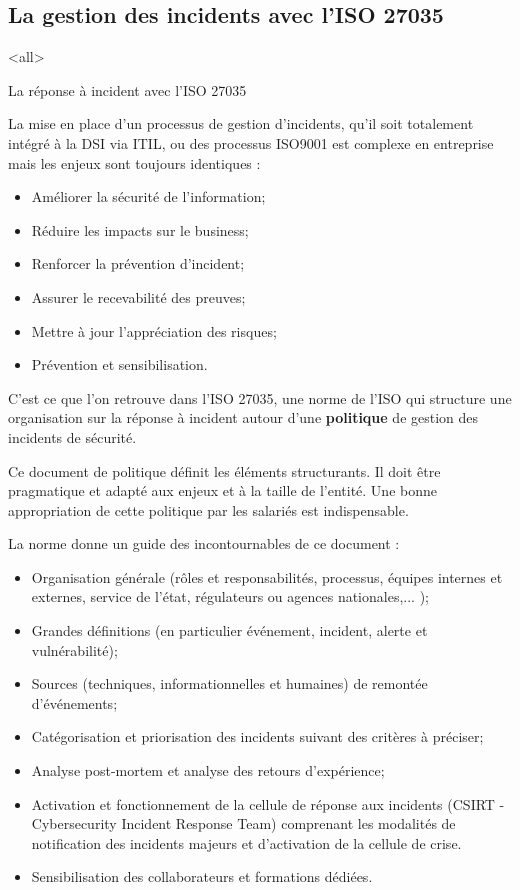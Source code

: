 \subsection{La gestion des incidents avec l'ISO 27035}
 
 
 
\mode<all>{\texframe
{La réponse à incident}
{avec l'ISO 27035}
{%
 La mise en place d'un processus de gestion d’incidents, qu'il soit totalement intégré à la DSI via ITIL, ou des processus ISO9001 est complexe en entreprise mais les enjeux sont toujours identiques :
\begin{itemize}
  \item  Améliorer la sécurité de l’information;
  \item  Réduire les impacts sur le business;
  \item  Renforcer la prévention d’incident;
  \item  Assurer le recevabilité des preuves;
  \item  Mettre à jour l’appréciation des risques;
  \item  Prévention et sensibilisation.
\end{itemize}
}} %

  C'est ce que l'on retrouve dans l'ISO 27035, une norme de l'ISO qui structure  une organisation sur la réponse à incident autour d'une \textbf{politique} de gestion des incidents de sécurité.

Ce document de politique définit les éléments structurants. Il doit être pragmatique et adapté aux enjeux et à la taille de l’entité. Une bonne appropriation de cette  politique par les salariés est indispensable. 

La norme donne un guide  des incontournables de ce document :

\begin{itemize}
  \item Organisation générale (rôles et responsabilités, processus, équipes internes et externes, service de l'état, régulateurs ou agences nationales,... );
  \item Grandes définitions  (en particulier événement, incident, alerte et vulnérabilité);
  \item Sources (techniques, informationnelles et humaines) de remontée d’événements;
  \item Catégorisation et priorisation des incidents suivant des critères à préciser;
  \item Analyse post-mortem et analyse des retours d’expérience;
  \item Activation et fonctionnement de la cellule de réponse aux incidents (CSIRT - Cybersecurity Incident Response Team) comprenant les modalités de notification des incidents majeurs et d’activation de la cellule de crise.
  \item Sensibilisation des collaborateurs et formations dédiées.
\end{itemize}

